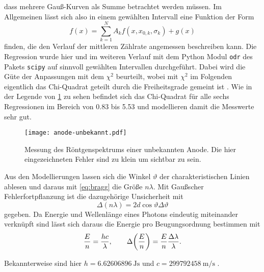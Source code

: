 dass mehrere Gauß-Kurven als Summe betrachtet werden müssen. Im Allgemeinen lässt sich also in einem 
gewählten Intervall eine Funktion der Form 
\begin{equation*}
	f(x) = \sum_{k=1}^N A_kf(x,x_{0,k}, \sigma_k) + g(x)
\end{equation*}
finden, die den Verlauf der mittleren Zählrate angemessen beschreiben kann. Die Regression wurde hier und im weiteren 
Verlauf mit dem Python 
Modul \verb|odr| des Pakets \verb|scipy| auf sinnvoll 
gewählten Intervallen durchgeführt. Dabei wird die Güte der Anpassungen mit dem $\chi^2$ beurteilt, 
wobei mit $\chi^2$ im Folgenden eigentlich das Chi-Quadrat geteilt durch die Freiheitsgrade gemeint ist 
\cite{wiki:reduced_chi_square}. Wie in der Legende von \cref{fig:anode-unbekannt-messung} zu sehen befindet 
sich das Chi-Quadrat für alle sechs Regressionen im Bereich von \num{0.83} bis \num{5.53} und modellieren 
damit die Messwerte sehr gut.\par

\begin{figure}[htb]
	\centering
	\texttt{[image: anode-unbekannt.pdf]}
	\caption{Messung des Röntgenspektrums einer unbekannten Anode. Die hier eingezeichneten Fehler sind zu klein um
	sichtbar zu sein.}
	\label{fig:anode-unbekannt-messung}
\end{figure}

Aus den Modellierungen lassen sich die Winkel $\vartheta$ der charakteristischen Linien ablesen und daraus mit 
\cref{eq:bragg} die Größe $n\lambda$. Mit Gaußscher Fehlerfortpflanzung \cite{wiki:fehlerfortpflanzung}
ist die dazugehörige Unsicherheit mit 
\begin{equation}
	\Delta(n\lambda) = 2d\cos\vartheta\Delta\vartheta
	\label{eq:bragg_uncertainty}
\end{equation}
gegeben. Da Energie und Wellenlänge eines Photons eindeutig miteinander verknüpft sind lässt sich daraus 
die Energie pro Beugungsordnung bestimmen mit
\begin{equation}
	\frac{E}{n} = \frac{hc}{\lambda}, \qquad \Delta\qty(\frac{E}{n}) = \frac{E}{n}\frac{\Delta\lambda}{\lambda}.
	\label{eq:energy_photon}
\end{equation}

Bekannterweise sind hier $h=\SI{6.62606896}{\joule\second}$ und $c=\SI{299 792 458}{\meter\per\second}$ 
\cite{Demtröder:829119}.



